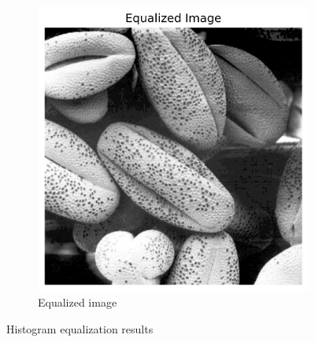 \documentclass[10pt,a4paper]{article}
\begin{document}
\begin{figure}[H]
\begin{subfigure}{0.48\textwidth}
        \includegraphics[width=\textwidth]{task5/2_equalized_image.png}
        \caption{Equalized image}
    \end{subfigure}
    \caption{Histogram equalization results}
\end{figure}
\end{document}
